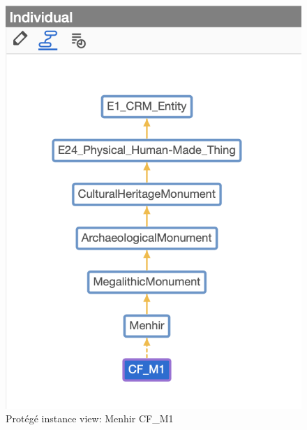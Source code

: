 \documentclass[10pt]{report}
\begin{document}
\begin{figure}[!ht]
\centering
\includegraphics[width=0.5\linewidth]{figures/menir-inst.png}
\caption{\label{menir-inst} Protégé instance view: Menhir CF\_M1}
\end{figure}
\end{document}
